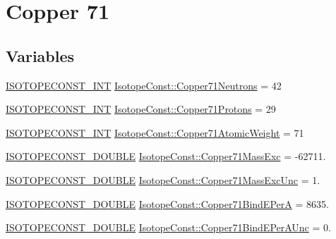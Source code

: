 \hypertarget{group___isotope_const-_copper-_cu71}{}\section{Copper 71}
\label{group___isotope_const-_copper-_cu71}
\subsection*{Variables}
\begin{DoxyCompactItemize}
\item 
\mbox{\hyperlink{group___isotope_const-_macros_ga5f18360b3e99483a35c32d789e62621c}{I\+S\+O\+T\+O\+P\+E\+C\+O\+N\+S\+T\+\_\+\+I\+NT}} \mbox{\hyperlink{group___isotope_const-_copper-_cu71_ga2a682fb0eb1c8ec001add17c2a6227d7}{Isotope\+Const\+::\+Copper71\+Neutrons}} = 42
\item 
\mbox{\hyperlink{group___isotope_const-_macros_ga5f18360b3e99483a35c32d789e62621c}{I\+S\+O\+T\+O\+P\+E\+C\+O\+N\+S\+T\+\_\+\+I\+NT}} \mbox{\hyperlink{group___isotope_const-_copper-_cu71_ga195eb9b17acce0d9fe407e85a868d096}{Isotope\+Const\+::\+Copper71\+Protons}} = 29
\item 
\mbox{\hyperlink{group___isotope_const-_macros_ga5f18360b3e99483a35c32d789e62621c}{I\+S\+O\+T\+O\+P\+E\+C\+O\+N\+S\+T\+\_\+\+I\+NT}} \mbox{\hyperlink{group___isotope_const-_copper-_cu71_ga88072a72cf9a3400d333e1c7ac76feb3}{Isotope\+Const\+::\+Copper71\+Atomic\+Weight}} = 71
\item 
\mbox{\hyperlink{group___isotope_const-_macros_ga8f45a7272ce02c0b4c65c44636ed719a}{I\+S\+O\+T\+O\+P\+E\+C\+O\+N\+S\+T\+\_\+\+D\+O\+U\+B\+LE}} \mbox{\hyperlink{group___isotope_const-_copper-_cu71_gabdb11ad7dea351bd7f991d07b60eb995}{Isotope\+Const\+::\+Copper71\+Mass\+Exc}} = -\/62711.
\item 
\mbox{\hyperlink{group___isotope_const-_macros_ga8f45a7272ce02c0b4c65c44636ed719a}{I\+S\+O\+T\+O\+P\+E\+C\+O\+N\+S\+T\+\_\+\+D\+O\+U\+B\+LE}} \mbox{\hyperlink{group___isotope_const-_copper-_cu71_ga49c549beb074a851ddfd5fb3cf0ae999}{Isotope\+Const\+::\+Copper71\+Mass\+Exc\+Unc}} = 1.
\item 
\mbox{\hyperlink{group___isotope_const-_macros_ga8f45a7272ce02c0b4c65c44636ed719a}{I\+S\+O\+T\+O\+P\+E\+C\+O\+N\+S\+T\+\_\+\+D\+O\+U\+B\+LE}} \mbox{\hyperlink{group___isotope_const-_copper-_cu71_ga30aae1bab9c661a5347a45a0017d73f5}{Isotope\+Const\+::\+Copper71\+Bind\+E\+PerA}} = 8635.
\item 
\mbox{\hyperlink{group___isotope_const-_macros_ga8f45a7272ce02c0b4c65c44636ed719a}{I\+S\+O\+T\+O\+P\+E\+C\+O\+N\+S\+T\+\_\+\+D\+O\+U\+B\+LE}} \mbox{\hyperlink{group___isotope_const-_copper-_cu71_ga3a30201fa7e48c1704e01d9f7c0689e3}{Isotope\+Const\+::\+Copper71\+Bind\+E\+Per\+A\+Unc}} = 0.

\end{DoxyCompactItemize}
